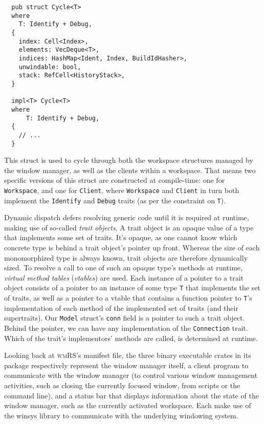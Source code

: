 \begin{verbatim}
  pub struct Cycle<T>
  where
    T: Identify + Debug,
  {
    index: Cell<Index>,
    elements: VecDeque<T>,
    indices: HashMap<Ident, Index, BuildIdHasher>,
    unwindable: bool,
    stack: RefCell<HistoryStack>,
  }

  impl<T> Cycle<T>
  where
      T: Identify + Debug,
  {
    // ...
  }
\end{verbatim}

This  struct is  used to  cycle through  both the  workspace structures  managed
by  the  window  manager, as  well  as  the  clients  within a  workspace.  That
means  two specific  versions of  this struct  are constructed  at compile-time:
one  for \texttt{Workspace},  and  one for  \texttt{Client},
where  \texttt{Workspace} and  \texttt{Client} in  turn both
implement  the \texttt{Identify}  and \texttt{Debug}  traits
(as per the constraint on \texttt{T}).


Dynamic dispatch defers resolving generic code  until it is required at runtime,
making use  of so-called  \textit{trait objects}.  A trait  object is  an opaque
value of a type  that implements some set of traits. It's  opaque, as one cannot
know which  concrete type is behind  a trait object's pointer  up front. Whereas
the size of each monomorphized type is always known, trait objects are therefore
dynamically  sized.  To  resolve  a  call  to  one  of  such  an  opaque  type's
methods at runtime, \textit{virtual  method tables} (\textit{vtables}) are used.
Each  instance  of  a pointer  to  a  trait  object  consists of  a  pointer  to
an  instance  of some  type  \texttt{T}  that  implements the  set  of
traits,  as well  as a  pointer to  a vtable  that contains  a function  pointer
to  \texttt{T}'s  implementation of  each  method  of the  implemented
set  of traits  (and their  supertraits). Our  \texttt{Model} struct's
\texttt{conn} field  is a pointer to  such a trait object.  Behind the
pointer,  we can  have any  implementation of  the \texttt{Connection}
trait. Which of  the trait's implementors' methods are called,  is determined at
runtime.

Looking  back at  \textsc{wmRS}'s  manifest file,  the  three binary  executable
crates in its package respectively represent the window manager itself, a client
program  to communicate  with  the  window manager  (to  control various  window
management  activities,  such as  closing  the  currently focused  window,  from
scripts or the  command line), and a status bar  that displays information about
the state of the window manager, such as the currently activated workspace. Each
make use  of the  winsys library  to communicate  with the  underlying windowing
system.\\

